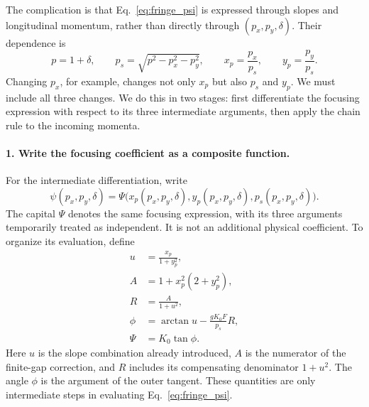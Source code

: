 The complication is that Eq.~\eqref{eq:fringe_psi} is expressed through
slopes and longitudinal momentum, rather than directly through
$(p_x,p_y,\delta)$. Their dependence is
\begin{equation}
 p=1+\delta,\qquad p_s=\sqrt{p^2-p_x^2-p_y^2},\qquad
 x_p=\frac{p_x}{p_s},\qquad y_p=\frac{p_y}{p_s}.
 \label{eq:fringe_derivative_inputs}
\end{equation}
Changing $p_x$, for example, changes not only $x_p$ but also $p_s$
and $y_p$. We must include all three changes. We do this in two stages:
first differentiate the focusing expression with respect to its three
intermediate arguments, then apply the chain rule to the incoming momenta.

\paragraph{1. Write the focusing coefficient as a composite function.}
For the intermediate differentiation, write
\begin{equation}
 \psi(p_x,p_y,\delta)
 =\Psi\bigl(x_p(p_x,p_y,\delta),
            y_p(p_x,p_y,\delta),p_s(p_x,p_y,\delta)\bigr).
\end{equation}
The capital $\Psi$ denotes the same focusing expression, with its three
arguments temporarily treated as independent. It is not an additional
physical coefficient. To organize its evaluation, define
\begin{align}
 u&=\frac{x_p}{1+y_p^2},\\
 A&=1+x_p^2(2+y_p^2),\\
 R&=\frac{A}{1+u^2},\\
 \phi&=\arctan u-\frac{gK_0F}{p_s}R,\\
 \Psi&=K_0\tan\phi.
 \label{eq:fringe_derivative_composition}
\end{align}
Here $u$ is the slope combination already introduced, $A$ is the numerator
of the finite-gap correction, and $R$ includes its compensating denominator
$1+u^2$. The angle $\phi$ is the argument of the outer tangent. These
quantities are only intermediate steps in evaluating Eq.~\eqref{eq:fringe_psi}.


